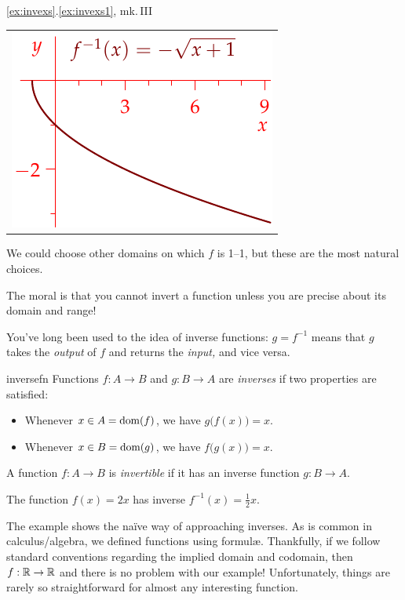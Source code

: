 \begin{example*}{\ref*{ex:invexs}.\ref{ex:invexs1}, mk.\,III}{}
\begin{center}
\begin{minipage}[t]{0.35\linewidth}
\begin{tabular}{@{}c@{}}
				\includegraphics{inverses-combi3}
			\end{tabular}
		\end{minipage}
	\end{center}
	We could choose other domains on which $f$ is 1--1, but these are the most natural choices.
\end{example*}

The moral is that you cannot invert a function unless you are precise about its domain and range!

\goodbreak


\iffalse
\clearpage


You've long been used to the idea of inverse functions: $g=f^{-1}$ means that $g$ takes the \emph{output} of $f$ and returns the \emph{input,} and vice versa.

\begin{defn}{}{inversefn}
Functions $f:A\to B$ and $g:B\to A$ are \emph{inverses} if two properties are satisfied:
\begin{itemize}
  \item Whenever $x\in A=\operatorname{dom}(f)$, we have $g\bigl(f(x)\bigr)=x$.
  \item Whenever $x\in B=\operatorname{dom}(g)$, we have $f\bigl(g(x)\bigr)=x$.
\end{itemize}
A function $f:A\to B$ is \emph{invertible} if it has an inverse function $g:B\to A$. 
\end{defn}

\begin{example}{}{}
The function $f(x)=2x$ has inverse $f^{-1}(x)=\frac 12x$.
\end{example}

The example shows the naïve way of approaching inverses. As is common in calculus/algebra, we defined functions using formulæ. Thankfully, if we follow standard conventions regarding the implied domain and codomain, then $f:\mathbb{R}\to\mathbb{R}$ and there is no problem with our example! Unfortunately, things are rarely so straightforward for almost any interesting function.

